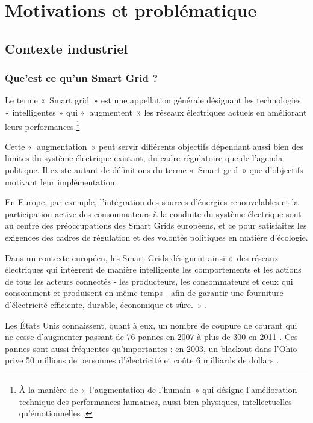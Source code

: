 \chapter{Motivations et problématique}
\label{chap:problematique}

\section{Contexte industriel}

\subsection{Que'est ce qu'un Smart Grid ?}
Le terme «~Smart grid~» est une appellation générale désignant les technologies « intelligentes » qui «~augmentent~» les réseaux électriques actuels en améliorant leurs performances.\footnote{À la manière de «~l'augmentation de l'humain~» qui désigne l'amélioration technique des performances humaines, aussi bien physiques, intellectuelles qu'émotionnelles \cite{le2013humain}.}

Cette «~augmentation~» peut servir différents objectifs dépendant aussi bien des limites du système électrique existant, du cadre régulatoire que de l'agenda politique. Il existe autant de définitions du terme «~Smart grid~» que d'objectifs motivant leur implémentation.

En Europe, par exemple, l'intégration des sources d'énergies renouvelables et la participation active des consommateurs à la conduite du système électrique sont au centre des préoccupations des Smart Grids européens, et ce pour satisfaites les exigences des cadres de régulation et des volontés politiques en matière d'écologie.

Dans un contexte européen, les Smart Grids désignent ainsi «~des réseaux électriques qui intègrent de manière intelligente les comportements et les actions de tous les acteurs connectés - les producteurs, les consommateurs et ceux qui consomment et produisent en même temps - afin de garantir une fourniture d'électricité efficiente, durable, économique et sûre.~» \cite{ETP}.

Les États Unis connaissent, quant à eux, un nombre de coupure de courant qui ne cesse d'augmenter passant de 76 pannes en 2007 à plus de 300 en 2011 \cite{detroit}. Ces pannes sont aussi fréquentes qu'importantes : en 2003, un blackout dans l'Ohio prive 50 millions de personnes d'électricité et coûte 6 milliards de dollars \cite{andersson2005causes}.

